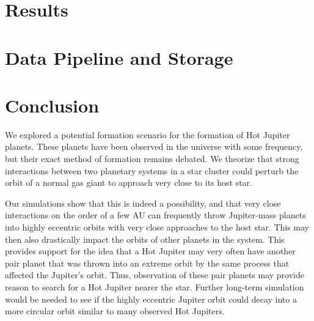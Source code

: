 \documentclass[12pt]{article}
\begin{document}


\section{Results}




\section{Data Pipeline and Storage}

\section{Conclusion}

We explored a potential formation scenario for the formation of Hot Jupiter
planets. These planets have been observed in the universe with some frequency,
but their exact method of formation remains debated. 
We theorize that strong interactions between two planetary systems in a star
cluster could perturb the orbit of a normal gas giant to approach very close to
its host star. 

Our simulations show that this is indeed a possibility, and that very close
interactions on the order of a few AU can frequently throw Jupiter-mass planets into
highly eccentric orbits with very close approaches to the host star. 
This may then also drastically impact the orbits of other planets
in the system. This provides support for the idea that a Hot Jupiter may very
often have another pair planet that was thrown into an extreme orbit by the same
process that affected the Jupiter's orbit. Thus,
observation of these pair planets may provide reason to search for a Hot Jupiter
nearer the star.
Further long-term simulation would be needed to see if the highly eccentric Jupiter
orbit could decay into a more circular orbit similar to many observed Hot Jupiters.

\clearpage
\end{document}
